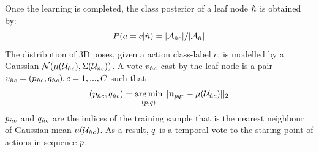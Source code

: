 

Once the learning is completed, the class posterior of a leaf node ${\hat{n}}$ is obtained by:  
\begin{equation}
	\label{eq:dforest_treeposterior}
	P(a = c| {\hat{n}}) = |\mathcal{A}_{{\hat{n}} c}|/| \mathcal{A}_{{\hat{n}}}| 
\end{equation}
The distribution of 3D poses, given a action class-label $c$, is modelled by a Gaussian 
$\mathcal{N}(\mu({\mathcal{U}}_{{\hat{n}} c}), \Sigma(\mathcal{U}_{{\hat{n}} c}))$.
A vote $v_{{\hat{n}} c}$ cast by the leaf node is a  pair  
$ v_{{\hat{n}} c}= ( p_{{\hat{n}} c}, q_{{\hat{n}} c}), c = 1,...,C$ such that
\begin{equation}
	(p_{{\hat{n}} c}, q_{{\hat{n}} c}) =  
	\displaystyle\operatorname*{arg\,min}_{(p, q)} || \mathbf{u}_{pqr} - \mu({\mathcal{U}}_{{\hat{n}} c}) ||_{2}
\end{equation}
$p_{{\hat{n}} c}$ and $q_{{\hat{n}} c}$ are the indices of the training sample that is the nearest neighbour of Gaussian mean $\mu(\mathcal{U}_{{\hat{n}} c})$. As a result, $q$ is a temporal vote to the staring point of actions in sequence $p$.





